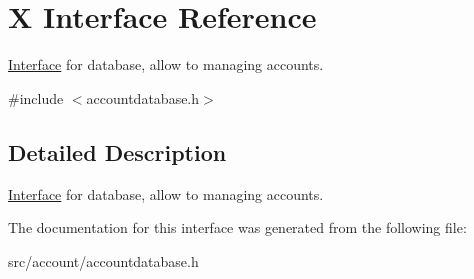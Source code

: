 \hypertarget{interfaceX}{}\section{X Interface Reference}
\label{interfaceX}


\hyperlink{interfaceInterface}{Interface} for database, allow to managing accounts.  




{\ttfamily \#include $<$accountdatabase.\+h$>$}



\subsection{Detailed Description}
\hyperlink{interfaceInterface}{Interface} for database, allow to managing accounts. 

The documentation for this interface was generated from the following file\+:\begin{DoxyCompactItemize}
\item 
src/account/accountdatabase.\+h\end{DoxyCompactItemize}
